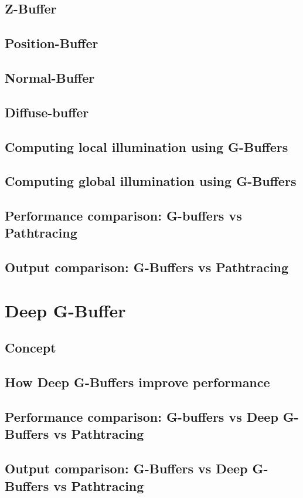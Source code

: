 \documentclass{ACGSeminar}
\begin{document}
	\subsection{Z-Buffer}
	\subsection{Position-Buffer}
	\subsection{Normal-Buffer}
	\subsection{Diffuse-buffer}
	\subsection{Computing local illumination using G-Buffers}
	\subsection{Computing global illumination using G-Buffers}
	\subsection{Performance comparison: G-buffers vs Pathtracing}
	\subsection{Output comparison: G-Buffers vs Pathtracing}

\section{Deep G-Buffer}
	\subsection{Concept}
	\subsection{How Deep G-Buffers improve performance}
	\subsection{Performance comparison: G-buffers vs Deep G-Buffers vs Pathtracing}
	\subsection{Output comparison: G-Buffers vs Deep G-Buffers vs Pathtracing}
\end{document}
